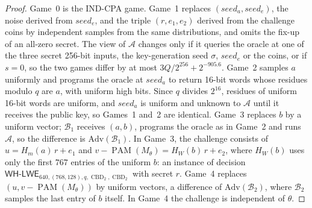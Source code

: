 \documentclass[11pt,a4paper]{article}
\theoremstyle{definition}
\newcommand{\CBD}{\operatorname{CBD}}
\newcommand{\PAM}{\operatorname{PAM}}
\newcommand{\WHLWE}{\textsf{WH-LWE}}
\begin{document}
\begin{proof}
Game~0 is the IND-CPA game. Game~1 replaces $(\mathit{seed}_a, \mathit{seed}_e)$, the noise derived from $\mathit{seed}_e$, and the triple $(r, e_1, e_2)$ derived from the challenge coins by independent samples from the same distributions, and omits the fix-up of an all-zero secret. The view of $\mathcal{A}$ changes only if it queries the oracle at one of the three secret 256-bit inputs, the key-generation seed $\sigma$, $\mathit{seed}_e$ or the coins, or if $s = 0$, so the two games differ by at most $3Q/2^{256} + 2^{-905.6}$. Game~2 samples $a$ uniformly and programs the oracle at $\mathit{seed}_a$ to return 16-bit words whose residues modulo $q$ are $a$, with uniform high bits. Since $q$ divides $2^{16}$, residues of uniform 16-bit words are uniform, and $\mathit{seed}_a$ is uniform and unknown to $\mathcal{A}$ until it receives the public key, so Games~1 and~2 are identical. Game~3 replaces $b$ by a uniform vector; $\mathcal{B}_1$ receives $(a, b)$, programs the oracle as in Game~2 and runs $\mathcal{A}$, so the difference is $\mathrm{Adv}(\mathcal{B}_1)$. In Game~3, the challenge consists of $u = H_m(a)\,r + e_1$ and $v - \PAM(M_\theta) = H_W(b)\,r + e_2$, where $H_W(b)$ uses only the first $767$ entries of the uniform $b$: an instance of decision $\WHLWE_{640,(768,128),q,\CBD_2,\CBD_2}$ with secret $r$. Game~4 replaces $(u, v - \PAM(M_\theta))$ by uniform vectors, a difference of $\mathrm{Adv}(\mathcal{B}_2)$, where $\mathcal{B}_2$ samples the last entry of $b$ itself. In Game~4 the challenge is independent of $\theta$.


\end{proof}
\end{document}
